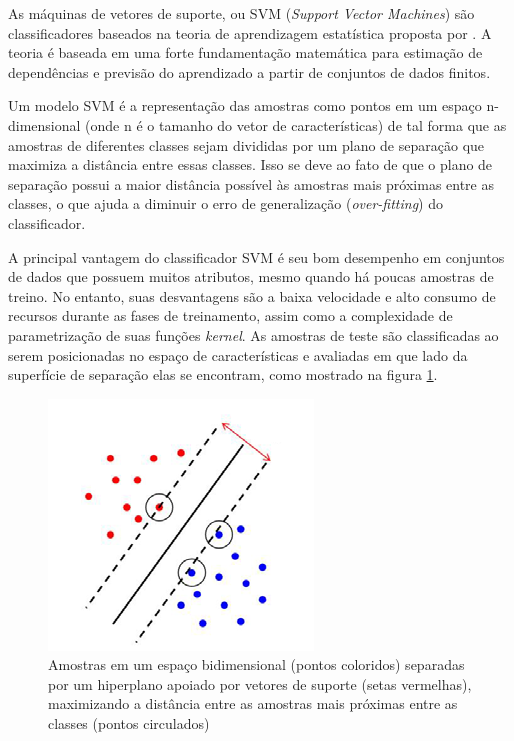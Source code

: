 As máquinas de vetores de suporte, ou SVM (\textit{Support Vector Machines}) são classificadores baseados na teoria de aprendizagem estatística proposta por \cite{vapnik:1995}. A teoria é baseada em uma forte fundamentação matemática para estimação de dependências e previsão do aprendizado a partir de conjuntos de dados finitos. 

Um modelo SVM é a representação das amostras como pontos em um espaço n-dimensional (onde n é o tamanho do vetor de características) de tal forma que as amostras de diferentes classes sejam divididas por um plano de separação que maximiza a distância entre essas classes. Isso se deve ao fato de que o plano de separação possui a maior distância possível às amostras mais próximas entre as classes, o que ajuda a diminuir o erro de generalização (\textit{over-fitting}) do classificador.

A principal vantagem do classificador SVM é seu bom desempenho em conjuntos de dados que possuem muitos atributos, mesmo quando há poucas amostras de treino. No entanto, suas desvantagens são a baixa velocidade e alto consumo de recursos durante as fases de treinamento, assim como a complexidade de parametrização de suas funções \textit{kernel}. As amostras de teste são classificadas ao serem posicionadas no espaço de características e avaliadas em que lado da superfície de separação elas se encontram, como mostrado na figura \ref{fig:svm}.

\begin{figure}[h!]
  \centering
  \includegraphics[scale=0.5]{imgs/svm}
  \caption[Máquina de vetores de suporte]{Amostras em um espaço bidimensional (pontos coloridos) separadas por um hiperplano apoiado por vetores de suporte (setas vermelhas), maximizando a distância entre as amostras mais próximas entre as classes (pontos circulados)}
  \label{fig:svm}
\end{figure}

